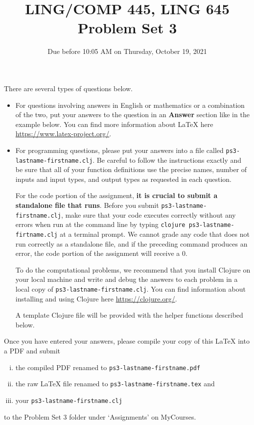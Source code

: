 \documentclass[10pt]{article}
\author{}
\newcommand{\PSnum}{3}
\begin{document}
\title{LING/COMP 445, LING 645\\Problem Set \PSnum}
\date{Due before 10:05 AM on Thursday, October 19, 2021}
\maketitle
There are several types of questions below. 
\begin{itemize}
\item
For questions involving answers in English or mathematics or a
combination of the two, put your answers to the question in an
\textbf{Answer} section like in the example below. You can find more
information about \LaTeX{} here \url{https://www.latex-project.org/}.

\item For programming questions,
please put your answers into a file called
\texttt{ps\PSnum-lastname-firstname.clj}. Be careful to follow the instructions
exactly and be sure that all of your function definitions use the
precise names, number of inputs and input types, and output types as
requested in each question.

For the code portion of the assignment, \textbf{it is crucial to submit a
standalone file that runs}. Before you submit \texttt{ps\PSnum-lastname-firstname.clj}, 
make sure that your code executes correctly without any errors 
when run at the command line by typing 
\texttt{clojure ps\PSnum-lastname-firtname.clj} at a terminal
prompt. We cannot grade any code that does not run correctly as a
standalone file, and if the preceding command produces an error,
the code portion of the assignment will receive a $0$.

To do the computational problems, we recommend that you install
Clojure on your local machine and write and debug the answers to each
problem in a local copy of \texttt{ps\PSnum-lastname-firstname.clj}. You can
find information about installing and using Clojure here
\url{https://clojure.org/}.

A template Clojure file will be provided with the helper
functions described below.
\end{itemize}
Once you have entered your answers, please compile your copy of this
\LaTeX{} into a PDF and submit 
\begin{enumerate}[(i),noitemsep]
\item
the compiled PDF renamed to
\texttt{ps\PSnum-lastname-firstname.pdf} 
\item
the raw \LaTeX{} file renamed to
\texttt{ps\PSnum-lastname-firstname.tex} and 
\item
your \texttt{ps\PSnum-lastname-firstname.clj}
\end{enumerate}
to the Problem Set \PSnum{} folder under `Assignments' on MyCourses.
\end{document}
